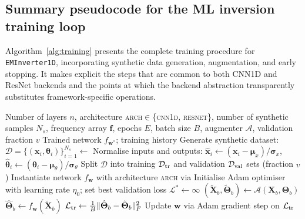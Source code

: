 \documentclass[review,12pt]{elsarticle}
\begin{document}
\subsection{Summary pseudocode for the ML inversion training loop}

Algorithm~\ref{alg:training} presents the complete training procedure
for \texttt{EMInverter1D}, incorporating synthetic data generation,
augmentation, and early stopping.
It makes explicit the steps that are common to both CNN1D and ResNet
backends and the points at which the backend abstraction transparently
substitutes framework-specific operations.

\begin{algorithm}[htbp]
\caption{\texttt{EMInverter1D} augmented training loop}
\label{alg:training}
\begin{algorithmic}[1]
\Require Number of layers $n$, architecture \textsc{arch}$\in$\{\textsc{cnn1d, resnet}\},
         number of synthetic samples $N_s$, frequency array $\bm{f}$,
         epochs $E$, batch size $B$, augmenter $\mathcal{A}$,
         validation fraction $v$
\Ensure  Trained network $f_{\bm{w}^*}$; training history
\State Generate synthetic dataset:
       $\mathcal{D} = \{(\mathbf{x}_i, \boldsymbol\theta_i)\}_{i=1}^{N_s}
       \leftarrow$ 
\State Normalise inputs and outputs:
       $\hat{\mathbf{x}}_i \leftarrow (\mathbf{x}_i - \bm\mu_x)/\bm\sigma_x$,
       $\hat{\boldsymbol\theta}_i \leftarrow (\boldsymbol\theta_i - \bm\mu_\theta)/\bm\sigma_\theta$
\State Split $\mathcal{D}$ into training $\mathcal{D}_{\rm tr}$
       and validation $\mathcal{D}_{\rm val}$ sets (fraction $v$)
\State Instantiate network $f_{\bm{w}}$ with architecture \textsc{arch}
       via   
\State Initialise Adam optimiser with learning rate $\eta_0$; set
       best validation loss $\mathcal{L}^* \leftarrow \infty$
    \State $(\tilde{\mathbf{X}}_b, \tilde{\boldsymbol\Theta}_b)
           \leftarrow \mathcal{A}(\mathbf{X}_b, \boldsymbol\Theta_b)$
    \State $\hat{\boldsymbol\Theta}_b \leftarrow f_{\bm{w}}(\tilde{\mathbf{X}}_b)$
    \State $\mathcal{L}_{\rm tr} \leftarrow
           \tfrac{1}{B}\|\hat{\boldsymbol\Theta}_b -
           \tilde{\boldsymbol\Theta}_b\|_F^2$
    \State Update $\bm{w}$ via Adam gradient step on $\mathcal{L}_{\rm tr}$

\end{algorithmic}
\end{algorithm}
\end{document}
